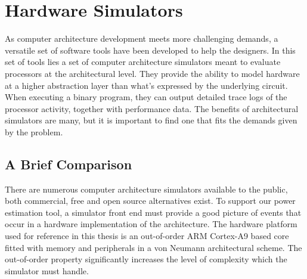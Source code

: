 \section{Hardware Simulators}

As computer architecture development meets more challenging demands, a versatile
set of software tools have been developed to help the designers. In this set of
tools lies a set of computer architecture simulators meant to evaluate
processors at the architectural level.  They provide the ability to model
hardware at a higher abstraction layer than what's expressed by the underlying
circuit. When executing a binary program, they can output detailed trace logs of
the processor activity, together with performance data.  The benefits of
architectural simulators are many, but it is important to find one that fits the
demands given by the problem.

\subsection{A Brief Comparison}
\label{subsec:simulators}
There are numerous computer architecture simulators available to the public,
both commercial, free and open source alternatives exist. To support our power
estimation tool, a simulator front end must provide a good picture of events
that occur in a hardware implementation of the architecture. The hardware
platform used for reference in this thesis is an out-of-order ARM Cortex-A9
based core fitted with memory and peripherals in a von Neumann architectural
scheme. The out-of-order property significantly increases the level of
complexity which the simulator must handle.

